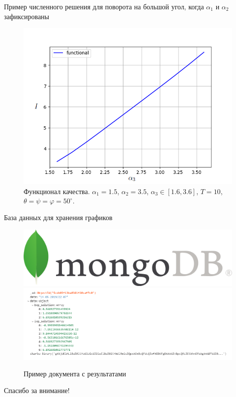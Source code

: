 \documentclass[10pt,utf8,presentation,notheorems,xcolor=dvipsnames,compress]{beamer}
\renewcommand{\phi}{\varphi} %
\begin{document}
\begin{frame}{Пример численного решения для поворота на большой угол, когда $\alpha_1$ и $\alpha_2$ зафиксированы}
\begin{figure}[H]
\center\includegraphics[scale=0.5]{fig/functional_50_alpha3_1_6-3_6_alpha1-1_5_alpha2-3_5.png}
\caption{Функционал качества. $\alpha_1 = 1.5$, $\alpha_2 = 3.5$, $\alpha_3 \in [1.6, 3.6]$, $\textit{T} = 10$, $\theta = \psi = \phi = 50^{\circ}$.}
\end{figure}
\end{frame}

\begin{frame}{База данных для хранения графиков}
\begin{figure}[H]
\center\includegraphics[scale=0.5]{fig/MongoDB-Logo.png}
\center\includegraphics[scale=0.5]{fig/mongo_results.png}
\caption{Пример документа с результатами}
\end{figure}
\end{frame}

\begin{frame}[standout]
Спасибо за внимание!
\end{frame}
\end{document}
